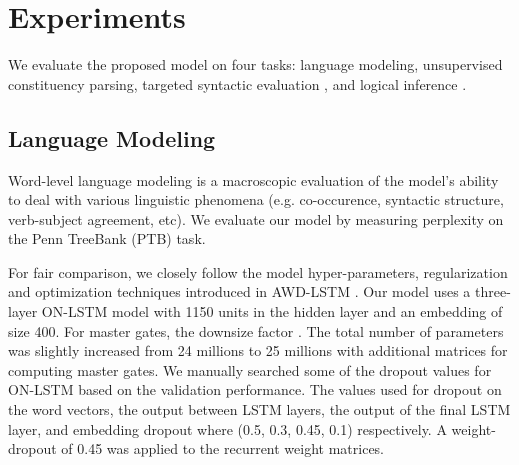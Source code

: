 \documentclass{article} \usepackage{iclr2019_conference,times}
\begin{document}
%
 
\section{Experiments}
We evaluate the proposed model on four tasks: language modeling, unsupervised constituency parsing, targeted syntactic evaluation \citep{marvin2018targeted}, and logical inference \citep{bowman2015tree}.

\subsection{Language Modeling}
Word-level language modeling is a macroscopic evaluation of the model's ability to deal with various linguistic phenomena (e.g. co-occurence, syntactic structure, verb-subject agreement, etc).
We evaluate our model by measuring perplexity on the Penn TreeBank (PTB) \citep{marcus1993building, mikolov2012statistical} task.

For fair comparison, we closely follow the model hyper-parameters, regularization and optimization techniques introduced in AWD-LSTM \citep{merityRegOpt}.
Our model uses a three-layer ON-LSTM model with 1150 units in the hidden layer and an embedding of size 400. 
For master gates, the downsize factor .
The total number of parameters was slightly increased from 24 millions to 25 millions with additional matrices for computing master gates.
We manually searched some of the dropout values for ON-LSTM based on the validation performance.
The values used for dropout on the word vectors, the output between LSTM layers, the output of the final LSTM layer, and embedding dropout where (0.5, 0.3, 0.45, 0.1) respectively. 
A weight-dropout of 0.45 was applied to the recurrent weight matrices.
\end{document}
